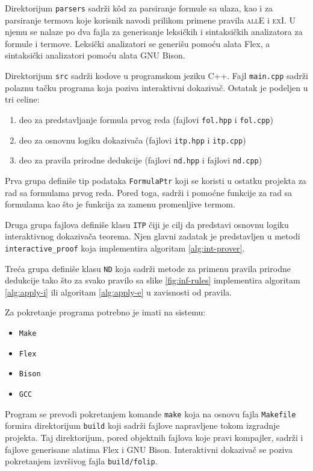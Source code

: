 \documentclass[a4paper,10pt]{article}
\theoremstyle{remark}
\begin{document}
Direktorijum \texttt{parsers} sadrži k\^od za parsiranje formule sa ulaza, kao i
za parsiranje termova koje korisnik navodi prilikom primene pravila
\textsc{allE} i \textsc{exI}.
U njemu se nalaze po dva fajla za generisanje leksičkih i sintaksičkih
analizatora za formule i termove.
Leksički analizatori se generišu pomoću alata Flex, a sintaksički analizatori
pomoću alata GNU Bison.

Direktorijum \texttt{src} sadrži kodove u programskom jeziku C++.
Fajl \texttt{main.cpp} sadrži polaznu tačku programa koja poziva interaktivni
dokazivač.
Ostatak je podeljen u tri celine:
\begin{enumerate}
    \itemsep-0.3em
    \item deo za predstavljanje formula prvog reda (fajlovi \texttt{fol.hpp} i
    \texttt{fol.cpp})
    \item deo za osnovnu logiku dokazivača (fajlovi \texttt{itp.hpp} i
    \texttt{itp.cpp})
    \item deo za pravila prirodne dedukcije (fajlovi \texttt{nd.hpp} i fajlovi
    \texttt{nd.cpp})
\end{enumerate}

Prva grupa definiše tip podataka \texttt{FormulaPtr} koji se koristi u ostatku
projekta za rad sa formulama prvog reda.
Pored toga, sadrži i pomoćne funkcije za rad sa formulama kao što je funkcija
za zamenu promenljive termom.

Druga grupa fajlova definiše klasu \texttt{ITP} čiji je cilj da predstavi osnovnu
logiku interaktivnog dokazivača teorema.
Njen glavni zadatak je predstavljen u metodi \texttt{interactive\_proof} koja
implementira algoritam \ref{alg:int-prover}.

Treća grupa definiše klasu \texttt{ND} koja sadrži metode za primenu pravila
prirodne dedukcije tako što za svako pravilo sa slike \ref{fig:inf-rules}
implementira algoritam \ref{alg:apply-i} ili algoritam \ref{alg:apply-e} u
zavisnosti od pravila.

Za pokretanje programa potrebno je imati na sistemu:
\begin{itemize}
    \itemsep-0.3em
    \item \texttt{Make}
    \item \texttt{Flex}
    \item \texttt{Bison}
    \item \texttt{GCC}
\end{itemize}
Program se prevodi pokretanjem komande \texttt{make} koja na osnovu fajla
\texttt{Makefile} formira direktorijum \texttt{build} koji sadrži fajlove
napravljene tokom izgradnje projekta.
Taj direktorijum, pored objektnih fajlova koje pravi kompajler,
sadrži i fajlove generisane alatima Flex i GNU Bison.
Interaktivni dokazivač se poziva pokretanjem izvršivog fajla
\texttt{build/folip}.
\end{document}
